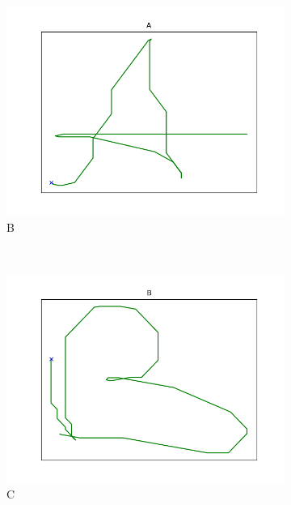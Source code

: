 \begin{figure}%
\centering
    \begin{subfigure}[b]{0.14\textwidth}
        \includegraphics[width=\textwidth]{images/gbem/orig_letters_fig/AORIG_letter_A_writer_8.png}
        \caption{B}
    \end{subfigure}
    ~
    \begin{subfigure}[b]{0.14\textwidth}
        \includegraphics[width=\textwidth]{images/gbem/orig_letters_fig/AORIG_letter_B_writer_7.png}
        \caption{C}
    \end{subfigure}
    ~
    \begin{subfigure}[b]{0.14\textwidth}

\end{subfigure}
\end{figure}

